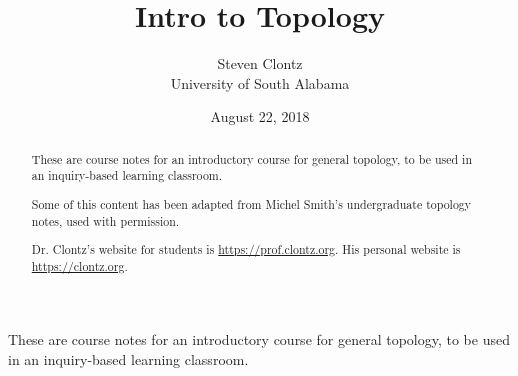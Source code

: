\documentclass[10pt,]{article}
\title{Intro to Topology}
\author{Steven Clontz\\
University of South Alabama
}
\date{August 22, 2018}
\begin{document}
\hypertarget{index}{}
\maketitle
\thispagestyle{empty}
\begin{abstract}
\hypertarget{p-1}{}%
These are course notes for an introductory course for general topology, to be used in an inquiry-based learning classroom.%
\par
\hypertarget{p-2}{}%
Some of this content has been adapted from Michel Smith's undergraduate topology notes, used with permission.%
\par
\hypertarget{p-3}{}%
Dr. Clontz's website for students is \url{https://prof.clontz.org}. His personal website is \url{https://clontz.org}.%
\end{abstract}
\hypertarget{p-4}{}%
These are course notes for an introductory course for general topology, to be used in an inquiry-based learning classroom.%
%
%
\typeout{************************************************}
\typeout{************************************************}
%
\end{document}
